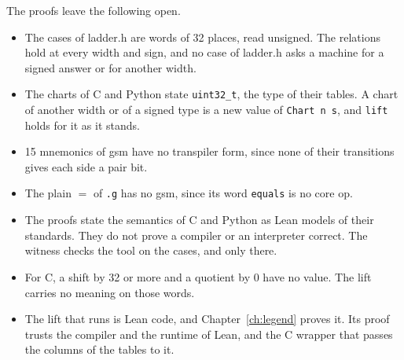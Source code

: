 The proofs leave the following open.
\begin{itemize}
  \item The cases of ladder.h are words of 32 places, read unsigned. The relations hold at every width and sign,
        and no case of ladder.h asks a machine for a signed answer or for another width.
  \item The charts of C and Python state \texttt{uint32\_t}, the type of their tables. A chart of another width or
        of a signed type is a new value of \texttt{Chart n s}, and \texttt{lift} holds for it as it stands.
  \item 15 mnemonics of gsm have no transpiler form, since none of their transitions gives each side a pair bit.
  \item The plain $=$ of \texttt{.g} has no gsm, since its word \texttt{equals} is no core op.
  \item The proofs state the semantics of C and Python as Lean models of their standards. They do not prove a
        compiler or an interpreter correct. The witness checks the tool on the cases, and only there.
  \item For C, a shift by 32 or more and a quotient by 0 have no value. The lift carries no meaning on those words.
  \item The lift that runs is Lean code, and Chapter~\ref{ch:legend} proves it. Its proof trusts the compiler and
        the runtime of Lean, and the C wrapper that passes the columns of the tables to it.
\end{itemize}
